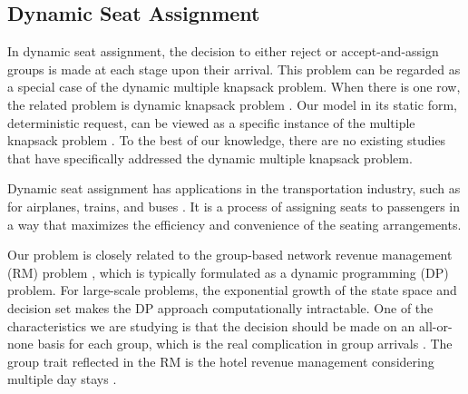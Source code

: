 

\subsection{Dynamic Seat Assignment}






In dynamic seat assignment, the decision to either reject or accept-and-assign groups is made at each stage upon their arrival. This problem can be regarded as a special case of the dynamic multiple knapsack problem. When there is one row, the related problem is dynamic knapsack problem \cite{kleywegt1998dynamic}. Our model in its static form, deterministic request, can be viewed as a specific instance of the multiple knapsack problem \cite{pisinger1999exact}. To the best of our knowledge, there are no existing studies that have specifically addressed the dynamic multiple knapsack problem. 

Dynamic seat assignment has applications in the transportation industry, such as for airplanes, trains, and buses \cite{hamdouch2011schedule, berge1993demand, zhu2023assign}. It is a process of assigning seats to passengers in a way that maximizes the efficiency and convenience of the seating arrangements.




Our problem is closely related to the group-based network revenue management (RM) problem \cite{williamson1992airline}, which is typically formulated as a dynamic programming (DP) problem. For large-scale problems, the exponential growth of the state space and decision set makes the DP approach computationally intractable. One of the characteristics we are studying is that the decision should be made on an all-or-none basis for each group, which is the real complication in group arrivals \cite{talluri2006theory}. The group trait reflected in the RM is the hotel revenue management considering multiple day stays \cite{aydin2018decomposition, bitran1995application}. 

